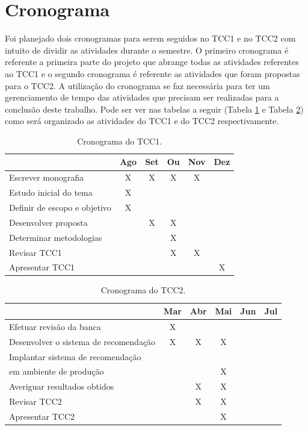 \section{Cronograma}

Foi planejado dois cronogramas para serem seguidos no TCC1 e no TCC2 com intuito de dividir as atividades durante o semestre. O primeiro cronograma é referente a primeira parte do projeto que abrange todas as atividades referentes ao TCC1 e o segundo cronograma é referente as atividades que foram propostas para o TCC2. A utilização do cronograma se faz necessária para ter um gerenciamento de tempo das atividades que precisam ser realizadas para a conclusão deste trabalho. Pode ser ver nas tabelas a seguir (Tabela \ref{tab:cronograma_tcc1} e Tabela \ref{tab:cronograma_tcc2}) como será organizado as atividades do TCC1 e do TCC2 respectivamente.

\begin{table}[H]
\centering
\caption[Cronograma do TCC1]{Cronograma do TCC1.}
\label{tab:cronograma_tcc1}
\begin{tabular}{lccccc}
\hline
\textbf{} & \textbf{Ago} & \textbf{Set} & \textbf{Ou} & \textbf{Nov} & \textbf{Dez} \\ \hline
Escrever monografia & X & X & X & X &  \\ \hline
Estudo inicial do tema & X &  &  &  &  \\ \hline
Definir de escopo e objetivo & X &  &  &  &  \\ \hline
Desenvolver proposta &  & X & X &  &  \\ \hline
Determinar metodologias &  &  & X &  &  \\ \hline
Revisar TCC1 &  &  & X & X &  \\ \hline
Apresentar TCC1 &  &  &  &  & X \\ \hline
\end{tabular}
\end{table}

\begin{table}[H]
\centering
\caption[Cronograma do TCC2]{Cronograma do TCC2.}
\label{tab:cronograma_tcc2}
\begin{tabular}{lccccc}
\hline
\textbf{} & \textbf{Mar} & \textbf{Abr} & \textbf{Mai} & \textbf{Jun} & \textbf{Jul} \\ \hline
Efetuar revisão da banca & X &  &  &  &  \\ \hline
Desenvolver o sistema de recomendação & X & X & X &  &  \\ \hline
Implantar sistema de recomendação \\ em ambiente de produção &  &  & X &  &  \\ \hline
Averiguar resultados obtidos &  & X & X &  & \\ \hline
Revisar TCC2 &  & X & X &  & \\ \hline
Apresentar TCC2 &  &  & X &  & \\ \hline
\end{tabular}
\end{table}

